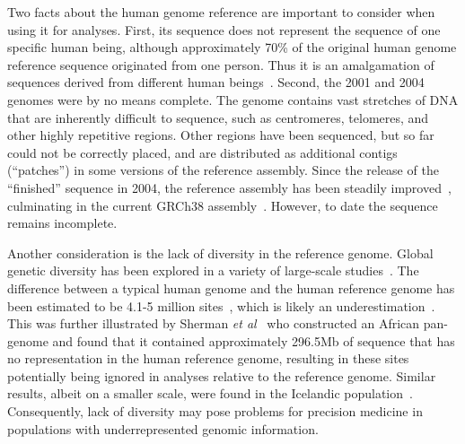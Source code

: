 \documentclass[11pt]{book}
\begin{document}
Two facts about the human genome reference are important to consider when using it for analyses. First, its sequence does not represent the sequence of one specific human being, although approximately 70\% of the original human genome reference sequence originated from one person. Thus it is an amalgamation of sequences derived from different human beings~\cite{Oseogawa:2001, Tuzun:2005}. Second, the 2001 and 2004 genomes were by no means complete. The genome contains vast stretches of DNA that are inherently difficult to sequence, such as centromeres, telomeres, and other highly repetitive regions. Other regions have been sequenced, but so far could not be correctly placed, and are distributed as additional contigs (``patches'') in some versions of the reference assembly. Since the release of the ``finished'' sequence in 2004, the reference assembly has been steadily improved~\cite{Church:2011}, culminating in the current GRCh38 assembly~\cite{Schneider:2017}. However, to date the sequence remains incomplete.

Another consideration is the lack of diversity in the reference genome. Global genetic diversity has been explored in a variety of large-scale studies~\cite{Altshuler:2012, Auton:2015, Choudhury:2020}. The difference between a typical human genome and the human reference genome has been estimated to be 4.1-5 million sites~\cite{Auton:2015}, which is likely an underestimation~\cite{Huddleston:2017}. This was further illustrated by Sherman \textit{et al}~\cite{Sherman:2019} who constructed an African pan-genome and found that it contained approximately 296.5Mb of sequence that has no representation in the human reference genome, resulting in these sites potentially being ignored in analyses relative to the reference genome. Similar results, albeit on a smaller scale, were found in the Icelandic population~\cite{Kehr:2017}. Consequently, lack of diversity may pose problems for precision medicine in populations with underrepresented genomic information.
\end{document}
